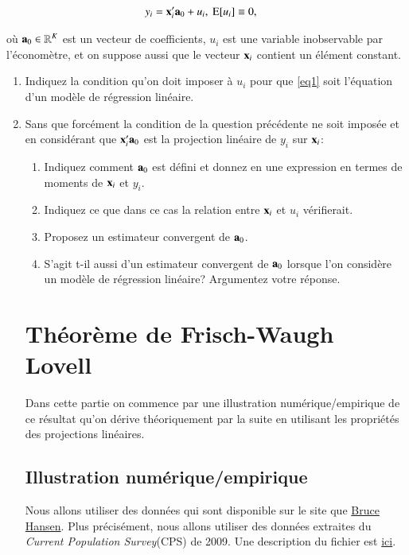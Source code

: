 \documentclass[10pt, reqno]{amsart}
\begin{document}
\begin{align}
y_i &={\mathbf x}_i^\prime{\mathbf a}_0 + u_i, \ \operatorname{E}[u_i] \equiv 0,
  \label{eq1}
\end{align}

où ${\mathbf a}_0\in \mathbb{R}^K$ est un vecteur de coefficients, $u_i$ est une variable inobservable par l'économètre, et on suppose aussi
que le vecteur ${\mathbf x}_i$ contient un élément constant.

\begin{enumerate}
\item Indiquez la condition qu'on doit imposer à $u_i$ pour que \eqref{eq1} soit l'équation d'un modèle de régression linéaire.
\item Sans que forcément la condition de la question précédente ne soit imposée et en considérant que ${\mathbf x}_i^\prime{\mathbf a}_0$
est la projection linéaire de $y_i$ sur ${\mathbf x}_i$:
\begin{enumerate}
  \item Indiquez comment ${\mathbf a}_0$ est défini et donnez en une expression en termes de moments de ${\mathbf x}_i$ et $y_i$.
  \item Indiquez ce que dans ce cas la relation entre ${\mathbf x}_i$ et $u_i$ vérifierait.
  \item Proposez un estimateur convergent de ${\mathbf a}_0$.
  \item S'agit t-il aussi d'un estimateur convergent de ${\mathbf a}_0$ lorsque l'on considère un modèle de régression linéaire? Argumentez votre réponse.
\end{enumerate}

\section{Théorème de Frisch-Waugh Lovell}

Dans cette partie on commence par une illustration numérique/empirique de ce résultat qu'on dérive théoriquement par la suite 
en utilisant les propriétés des projections linéaires.

\subsection{Illustration numérique/empirique}

Nous allons utiliser des données qui sont 
disponible sur le site que \href{https://www.ssc.wisc.edu/~bhansen/}{Bruce Hansen}. 
Plus précisément, nous allons utiliser des données extraites du \emph{Current Population Survey}(CPS) de 2009. 
Une description du fichier est \href{https://www.ssc.wisc.edu/~bhansen/econometrics/cps09mar_description.pdf}{ici}.


\end{enumerate}
\end{document}
